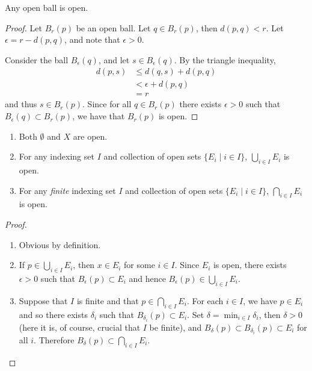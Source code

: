 \begin{proposition}
Any open ball is open.
\end{proposition}

\begin{proof}
Let $B_r(p)$ be an open ball. Let $q\in B_r(p)$, then $d(p,q)<r$. Let $\epsilon=r-d(p,q)$, and note that $\epsilon>0$.

Consider the ball $B_\epsilon(q)$, and let $s\in B_\epsilon(q)$. By the triangle inequality,
\begin{align*}
d(p,s)&\le d(q,s)+d(p,q)\\
&<\epsilon+d(p,q)\\
&=r
\end{align*}
and thus $s\in B_r(p)$. Since for all $q\in B_r(p)$ there exists $\epsilon>0$ such that $B_\epsilon(q)\subset B_r(p)$, we have that $B_r(p)$ is open.
\end{proof}

\begin{proposition}\label{prop:open-set-properties}
\begin{enumerate}[label=(\roman*)]
\item Both $\emptyset$ and $X$ are open.
\item For any indexing set $I$ and collection of open sets $\{E_i\mid i\in I\}$, $\bigcup_{i\in I}E_i$ is open.
\item For any \emph{finite} indexing set $I$ and collection of open sets $\{E_i\mid i\in I\}$, $\bigcap_{i\in I}E_i$ is open.
\end{enumerate}
\end{proposition}

\begin{proof} \
\begin{enumerate}[label=(\roman*)]
\item Obvious by definition.
\item If $p\in\bigcup_{i\in I}E_i$, then $x\in E_i$ for some $i\in I$. Since $E_i$ is open, there exists $\epsilon>0$ such that $B_\epsilon(p)\subset E_i$ and hence $ B_\epsilon(p)\in\bigcup_{i\in I}E_i$.
\item Suppose that $I$ is finite and that $p\in\bigcap_{i\in I}E_i$. For each $i\in I$, we have $p\in E_i$ and so there exists $\delta_i$ such that $B_{\delta_i}(p)\subset E_i$. Set $\delta=\min_{i\in I}\delta_i$, then $\delta>0$ (here it is, of course, crucial that $I$ be finite), and $B_\delta(p)\subset B_{\delta_i}(p)\subset E_i$ for all $i$. Therefore $ B_\delta(p)\subset\bigcap_{i\in I}E_i$.
\end{enumerate}
\end{proof}

